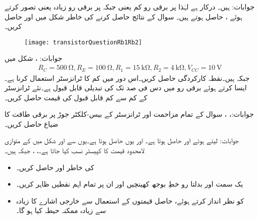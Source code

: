 جوابات: ہیں۔  درکار ہے لہٰذا  پر برقی رو  کم یعنی  جبکہ  پر برقی رو  زیادہ یعنی  تصور کرتے ہوئے ،  حاصل ہوتے ہیں۔
سوال  کے نتائج حاصل کرنے کی خاطر شکل  میں  اور  حاصل کریں۔
\begin{figure}
\centering
\texttt{[image: transistorQuestionRb1Rb2]}
\caption{}
\label{شکل_سوال_ٹرانزسٹر_دور_ب}
\end{figure}

جوابات: ، 
شکل  میں
\begin{align*}
R_C=\SI{500}{\ohm}, R_E=\SI{100}{\ohm}, R_1=\SI{15}{\kilo \ohm},R_2=\SI{4}{\kilo \ohm}, V_{CC}=\SI{10}{\volt}
\end{align*}
جبکہ  ہیں۔نقطہ کارکردگی حاصل کریں۔اس دور میں کم   کا ٹرانزسٹر استعمال کرنا ہے۔ایسا کرتے ہوئے برقی رو میں دس فی صد تک کی تبدیلی قابل قبول ہے۔نئے ٹرانزسٹر کے کم سے کم قابل قبول  کی قیمت حاصل کریں۔

جوابات:، ، 
سوال  کے تمام مزاحمت اور ٹرانزسٹر کے بیس-کلکٹر جوڑ پر برقی طاقت کا ضیاع حاصل کریں۔

جوابات: لیتے ہوئے  اور  حاصل ہوتا ہے۔ اور یوں  حاصل ہوتا ہے۔یوں  سے  اور 
 
شکل   میں  کے متوازی لامحدود قیمت کا کپیسٹر نسب کیا جاتا ہے۔، ،  جبکہ  ہیں۔
\begin{itemize}
\item
{} کی خاطر  اور  حاصل کریں۔
\item
یک سمت اور بدلتا رو خطِ بوجھ کھینچیں اور ان پر تمام اہم نقطیں  ظاہر کریں۔
\item
{} کو نظر انداز کرتے ہوئے، حاصل قیمتوں کے استعمال سے خارجی اشارے کا زیادہ سے زیادہ ممکنہ حیطہ کیا ہو گا۔
\end{itemize}

